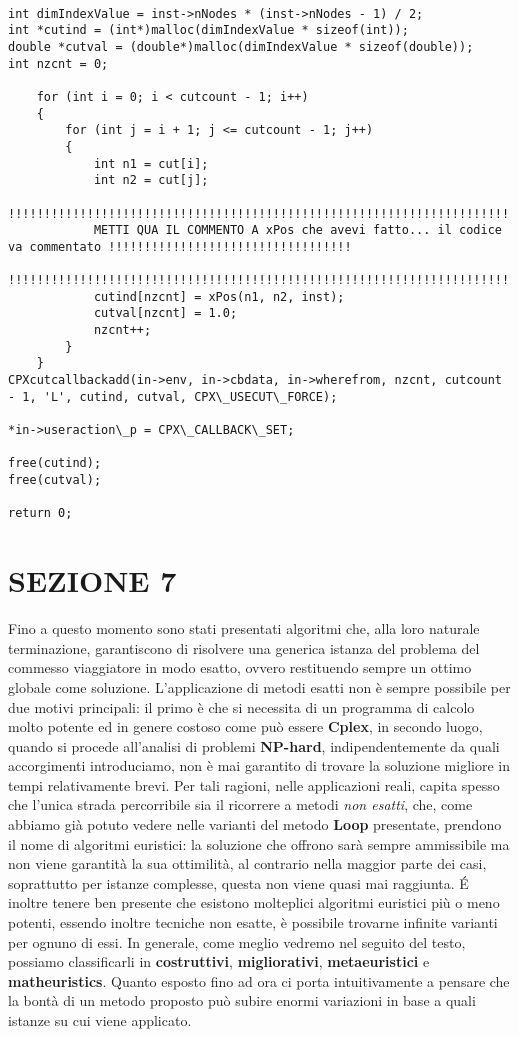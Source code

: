 \documentclass[11pt]{article}
\begin{document}
\begin{lstlisting}

int dimIndexValue = inst->nNodes * (inst->nNodes - 1) / 2;
int *cutind = (int*)malloc(dimIndexValue * sizeof(int));
double *cutval = (double*)malloc(dimIndexValue * sizeof(double));
int nzcnt = 0;

    for (int i = 0; i < cutcount - 1; i++)
    {
        for (int j = i + 1; j <= cutcount - 1; j++)
        {
            int n1 = cut[i];
            int n2 = cut[j];
            !!!!!!!!!!!!!!!!!!!!!!!!!!!!!!!!!!!!!!!!!!!!!!!!!!!!!!!!!!!!!!!!!!!!!!!!!!!!!!!!!!!!!!!!!!!!!!!!!!!!!!!!!!
            METTI QUA IL COMMENTO A xPos che avevi fatto... il codice va commentato !!!!!!!!!!!!!!!!!!!!!!!!!!!!!!!!!!
            !!!!!!!!!!!!!!!!!!!!!!!!!!!!!!!!!!!!!!!!!!!!!!!!!!!!!!!!!!!!!!!!!!!!!!!!!!!!!!!!!!!!!!!!!!!!!!!!!!!!!!!!!!
            cutind[nzcnt] = xPos(n1, n2, inst);
            cutval[nzcnt] = 1.0;
            nzcnt++;
        }
    }
CPXcutcallbackadd(in->env, in->cbdata, in->wherefrom, nzcnt, cutcount - 1, 'L', cutind, cutval, CPX\_USECUT\_FORCE);

*in->useraction\_p = CPX\_CALLBACK\_SET;

free(cutind);
free(cutval);

return 0;

\end{lstlisting}

\section*{SEZIONE 7}

Fino a questo momento sono stati presentati algoritmi che, alla loro naturale terminazione, garantiscono di risolvere una generica istanza del problema del commesso viaggiatore in modo esatto, ovvero restituendo sempre un ottimo globale come soluzione.
L'applicazione di metodi esatti non è sempre possibile per due motivi principali: il primo è che si necessita di un programma di calcolo molto potente ed in genere costoso come può essere \textbf{Cplex}, in secondo luogo, quando si procede all'analisi di problemi \textbf{NP-hard}, indipendentemente da quali accorgimenti introduciamo, non è mai garantito di trovare la soluzione migliore in tempi relativamente brevi.
Per tali ragioni, nelle applicazioni reali, capita spesso che l'unica strada percorribile sia il ricorrere a metodi \textit{non esatti}, che, come abbiamo già potuto vedere nelle varianti del metodo \textbf{Loop} presentate, prendono il nome di algoritmi euristici: la soluzione che offrono sarà sempre ammissibile ma non viene garantità la sua ottimilità, al contrario nella maggior parte dei casi, soprattutto per istanze complesse, questa non viene quasi mai raggiunta. \'E inoltre tenere ben presente che esistono molteplici algoritmi euristici più o meno potenti, essendo inoltre tecniche non esatte, è possibile trovarne infinite varianti per ognuno di essi. In generale, come meglio vedremo nel seguito del testo, possiamo classificarli in \textbf{costruttivi}, \textbf{migliorativi}, \textbf{metaeuristici} e \textbf{matheuristics}.
Quanto esposto fino ad ora ci porta intuitivamente a pensare che la bontà di un metodo proposto può subire enormi variazioni in base a quali istanze su cui viene applicato.
\end{document}
